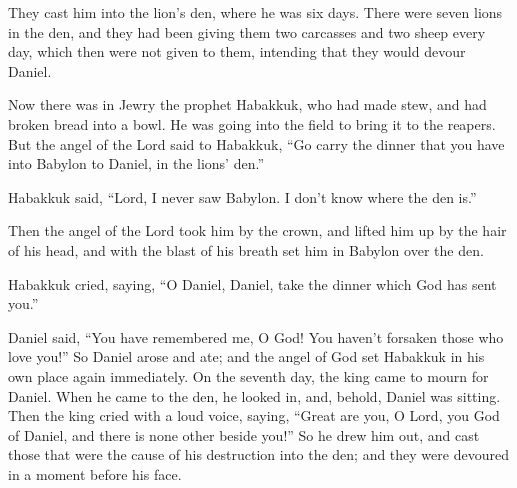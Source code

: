 {They cast him into the lion’s den, where he was six days.
There were seven lions in the den, and they had been giving them two carcasses and two sheep every day, which then were not given to them, intending that they would devour Daniel.
\par }{\PP {}Now there was in Jewry the prophet
Habakkuk, who had made stew, and had broken bread into a bowl. He was going into the field to bring it to the reapers.
But the angel of the Lord said to Habakkuk, “Go carry the dinner that you have into Babylon to Daniel, in the lions’ den.”
\par }{\PP {}Habakkuk said, “Lord, I never saw Babylon. I don’t know where the den is.”
\par }{\PP {}Then the angel of the Lord took him by the crown, and lifted him up by the hair of his head, and with the blast of his breath set him in Babylon over the den.
\par }{\PP {}Habakkuk cried, saying, “O Daniel, Daniel, take the dinner which God has sent you.”
\par }{\PP {}Daniel said, “You have remembered me, O God! You haven’t forsaken those who love you!”
So Daniel arose and ate; and the angel of God set Habakkuk in his own place again immediately.
On the seventh day, the king came to mourn for Daniel. When he came to the den, he looked in, and, behold, Daniel was sitting.
Then the king cried with a loud voice, saying, “Great are you, O Lord, you God of Daniel, and there is none other beside you!”
So he drew him out, and cast those that were the cause of his destruction into the den; and they were devoured in a moment before his face.
\par }